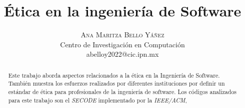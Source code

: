 \documentclass[twoside]{article}
\title{\vspace{-15mm}\fontsize{24pt}{10pt}\selectfont\textbf{Ética en la
ingeniería de Software}}
\author{
\large
\textsc{Ana Maritza Bello Yáñez} \\
\normalsize Centro de Investigación en Computación \\ 
\normalsize {abelloy2022@cic.ipn.mx}
\vspace{-5mm}
}
\date{}
\begin{document}
\maketitle %

\thispagestyle{fancy} %


\begin{abstract}

\noindent Este trabajo aborda aspectos relacionados a la ética en la Ingeniería
de Software. También muestra los esfuerzos realizados por diferentes
instituciones por definir un estándar de ética para profesionales de la
ingeniería de software. Los códigos analizados para este trabajo son el
\textit{SECODE} implementado por la \textit{IEEE/ACM}, 

\end{abstract}

\end{document}
